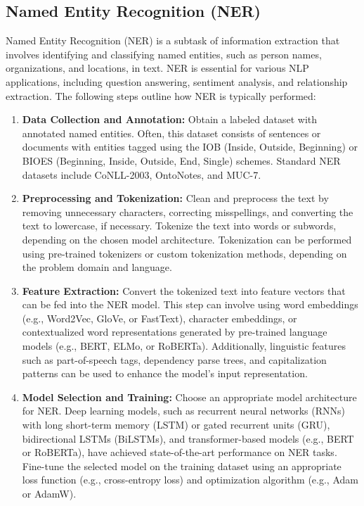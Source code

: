 \documentclass[12pt]{article}
\begin{document}
\subsection{Named Entity Recognition (NER)}

Named Entity Recognition (NER) is a subtask of information extraction that involves identifying and classifying named entities, such as person names, organizations, and locations, in text. NER is essential for various NLP applications, including question answering, sentiment analysis, and relationship extraction. The following steps outline how NER is typically performed:

\begin{enumerate}
\item \textbf{Data Collection and Annotation:} Obtain a labeled dataset with annotated named entities. Often, this dataset consists of sentences or documents with entities tagged using the IOB (Inside, Outside, Beginning) or BIOES (Beginning, Inside, Outside, End, Single) schemes. Standard NER datasets include CoNLL-2003, OntoNotes, and MUC-7.

\item \textbf{Preprocessing and Tokenization:} Clean and preprocess the text by removing unnecessary characters, correcting misspellings, and converting the text to lowercase, if necessary. Tokenize the text into words or subwords, depending on the chosen model architecture. Tokenization can be performed using pre-trained tokenizers or custom tokenization methods, depending on the problem domain and language.

\item \textbf{Feature Extraction:} Convert the tokenized text into feature vectors that can be fed into the NER model. This step can involve using word embeddings (e.g., Word2Vec, GloVe, or FastText), character embeddings, or contextualized word representations generated by pre-trained language models (e.g., BERT, ELMo, or RoBERTa). Additionally, linguistic features such as part-of-speech tags, dependency parse trees, and capitalization patterns can be used to enhance the model's input representation.

\item \textbf{Model Selection and Training:} Choose an appropriate model architecture for NER. Deep learning models, such as recurrent neural networks (RNNs) with long short-term memory (LSTM) or gated recurrent units (GRU), bidirectional LSTMs (BiLSTMs), and transformer-based models (e.g., BERT or RoBERTa), have achieved state-of-the-art performance on NER tasks. Fine-tune the selected model on the training dataset using an appropriate loss function (e.g., cross-entropy loss) and optimization algorithm (e.g., Adam or AdamW).


\end{enumerate}
\end{document}
